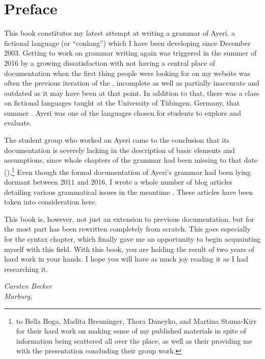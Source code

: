 \chapter{Preface}

This book constitutes my latest attempt at writing a grammar of Ayeri, a
fictional language (or \enquote{conlang}) which I have been developing since
December 2003. Getting to work on grammar writing again was triggered in the
summer of 2016 by a growing dissatisfaction with not having a central place of
documentation when the first thing people were looking for on my website was
often the previous iteration of the , incomplete as well as
partially inaccurate and outdated as it may have been at that point. In
addition to that, there was a class on fictional languages taught at the
University of Tübingen, Germany, that summer \autocite{buch2016ss}. Ayeri was
one of the languages chosen for students to explore and evaluate.

The student group who worked on Ayeri came to the conclusion that its
documentation is severely lacking in the description of basic elements and
assumptions, since whole chapters of the grammar had been missing to that date
(\cite[12]{boga2016}).\footnote{
to Bella Boga, Madita Breuninger, Thora Daneyko, and Martina Stama-Kirr for
their hard work on making sense of my published materials in spite of
information being scattered all over the place, as well as their providing me
with the presentation concluding their group work.} Even though the formal
documentation of Ayeri's grammar had been lying dormant between 2011 and 2016,
I wrote a whole number of blog articles detailing various grammatical issues in
the meantime \autocite[Blog]{benung}. These articles have been taken into
consideration here.

This book is, however, not just an extension to previous documentation, but for
the most part has been rewritten completely from scratch. This goes especially
for the syntax chapter, which finally gave me an opportunity to begin
acquainting myself with this field. With this book, you are holding the result
of two years of hard work in your hands. I hope you will have as much joy
reading it as I had researching it.

\begin{flushright}\itshape\footnotesize
Carsten Becker\\
Marburg,  \the\year
\end{flushright}